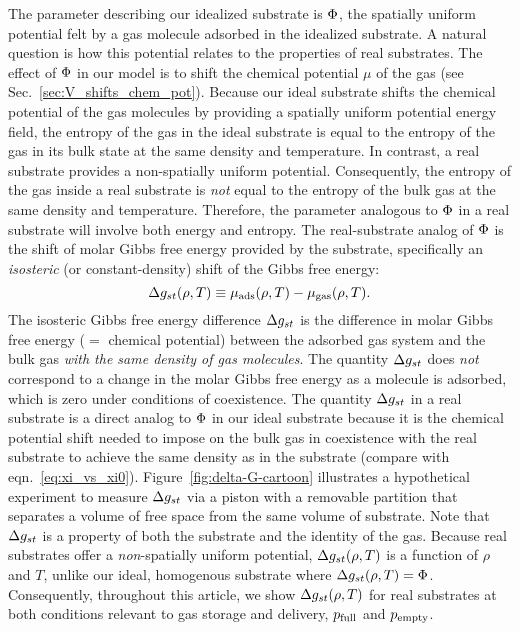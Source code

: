 The parameter describing our idealized substrate is $\Phi$, the spatially uniform potential felt by a gas molecule adsorbed in the idealized substrate. 
A natural question is how this potential relates to the properties of real substrates. 
The effect of $\Phi$ in our model is to shift the chemical potential $\mu$ of the gas (see Sec.~\ref{sec:V_shifts_chem_pot}).
Because our ideal substrate shifts the chemical potential of the gas molecules by providing a spatially uniform potential energy field, the entropy of the gas in the ideal substrate is equal to the entropy of the gas in its bulk state at the same density and temperature.
In contrast, a real substrate provides a non-spatially uniform potential. Consequently, the entropy of the gas inside a real substrate is \emph{not} equal to the entropy of the bulk gas at the same density and temperature. 
Therefore, the parameter analogous to $\Phi$ in a real substrate will involve both energy and entropy.
The real-substrate analog of $\Phi$ is the shift of molar Gibbs free energy provided by the substrate, specifically an \emph{isosteric} (or constant-density) shift of the Gibbs free energy:
\begin{equation}
   \Delta g_{st}(\rho, T) \equiv
    \mu_{\text{ads}}(\rho, T) - \mu_{\text{gas}}(\rho, T).
  \label{eq:g_st}
\end{equation}
The isosteric Gibbs free energy difference $\Delta g_{st}$ is the difference in molar Gibbs free energy ($=$ chemical potential) between the adsorbed gas system and the bulk gas \emph{with the same density of gas molecules}. The quantity $\Delta g_{st}$ does \emph{not} correspond to a change in the molar Gibbs free energy as a molecule is adsorbed, which is zero under conditions of coexistence. 
The quantity $\Delta g_{st}$ in a real substrate is a direct analog to $\Phi$ in our ideal substrate because it is the chemical potential shift needed to impose on the bulk gas in coexistence with the real substrate to achieve the same density as in the substrate (compare with eqn.~\ref{eq:xi_vs_xi0}).
Figure~\ref{fig:delta-G-cartoon} illustrates a hypothetical experiment to  measure $\Delta g_{st}$ via a piston with a removable partition that separates a volume of free space from the same volume of substrate. Note that $\Delta g_{st}$ is a property of both the substrate and the identity of the gas. Because real substrates offer a \emph{non}-spatially uniform potential, $\Delta g_{st}(\rho, T)$ is a function of $\rho$ and $T$, unlike our ideal, homogenous substrate where $\Delta g_{st}(\rho, T)=\Phi$. Consequently, throughout this article, we show $\Delta g_{st}(\rho, T)$ for real substrates at both conditions relevant to gas storage and delivery, $p_{\text{full}}$ and $p_{\text{empty}}$. 
